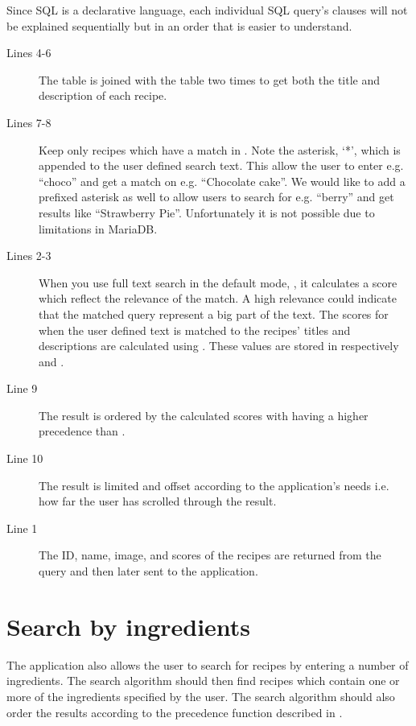 Since SQL is a declarative language, each individual SQL query's clauses will not be explained sequentially but in an order that is easier to understand.
\begin{description}
\item[Lines 4-6] The  table is joined with the  table two times to get both the title and description of each recipe.
\item[Lines 7-8] Keep only recipes which have a match in . Note the asterisk, `*', which is appended to the user defined search text. This allow the user to enter e.g. ``choco'' and get a match on e.g. ``Chocolate cake''. We would like to add a prefixed asterisk as well to allow users to search for e.g. ``berry'' and get results like ``Strawberry Pie''. Unfortunately it is not possible due to limitations in MariaDB.\cite{mariafulltext}
\item[Lines 2-3] When you use full text search in the default mode, \linebreak{}, it calculates a score which reflect the relevance of the match. A high relevance could indicate that the matched query represent a big part of the text. The scores for when the user defined text is matched to the recipes' titles and descriptions are calculated using . These values are stored in respectively  and .
\item[Line 9] The result is ordered by the calculated scores with  having a higher precedence than .
\item[Line 10] The result is limited and offset according to the application's needs i.e. how far the user has scrolled through the result.
\item[Line 1] The ID, name, image, and scores of the recipes are returned from the query and then later sent to the application.
\end{description}



\section{Search by ingredients}
The application also allows the user to search for recipes by entering a number of ingredients. The search algorithm should then find recipes which contain one or more of the ingredients specified by the user. The search algorithm should also order the results according to the precedence function described in .

